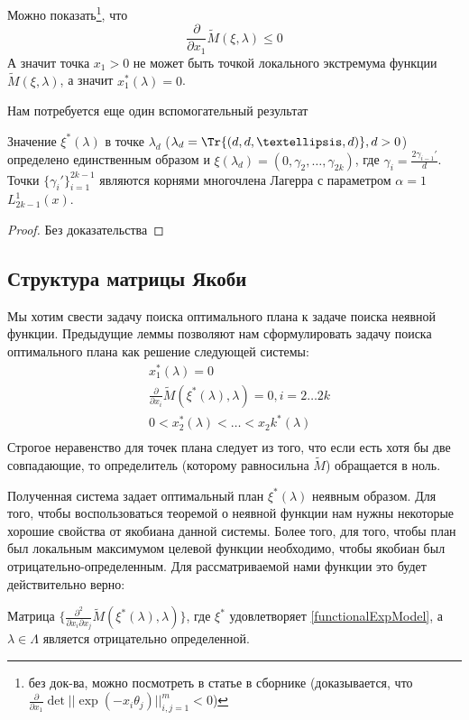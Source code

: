Можно показать\footnote{без док-ва, можно посмотреть в статье в сборнике (доказывается, что $\frac{\partial}{\partial x_1} \det ||\exp(-x_i\theta_j)||_{i,j=1}^m < 0$)}, что 
$$\frac{\partial}{\partial x_1} \tilde{M}(\xi, \lambda) \leq 0$$
А значит точка $x_1 > 0$ не может быть точкой локального экстремума функции $\tilde{M}(\xi, \lambda)$, а значит $x_1^{*}(\lambda) = 0$. 

Нам потребуется еще один вспомогательный результат
\begin{lem}
Значение $\xi^{*}(\lambda)$ в точке $\lambda_d$ ($\lambda_d = \Tr{(d, d,…,d)}, d > 0$)  определено единственным образом и 
$\xi(\lambda_d) = (0, \gamma_2, …, \gamma_{2k})$, где $\gamma_i = \frac{2\gamma_{i-1}'}{d}$. Точки $\{ \gamma_i' \}_{i=1}^{2k-1}$ являются корнями многочлена Лагерра с параметром $\alpha = 1$ $L_{2k-1}^1(x)$.  
\end{lem}
\begin{proof}
Без доказательства
\end{proof}

\subsection{Структура матрицы Якоби}
Мы хотим свести задачу поиска оптимального плана к задаче поиска неявной функции. Предыдущие леммы позволяют нам сформулировать задачу поиска оптимального плана как решение следующей системы:
\begin{equation}
\label{functionalExpModel}
\begin{split}
&x_1^{*}(\lambda)=0 \\
&\frac{\partial}{\partial x_i}\tilde{M}(\xi^{*}(\lambda), \lambda) = 0, i = 2…2k \\
& 0 < x_2^{*}(\lambda) < … < x_2k^{*}(\lambda)\\
\end{split}
\end{equation}
Строгое неравенство для точек плана следует из того, что если есть хотя бы две совпадающие, то определитель (которому равносильна $\tilde{M}$) обращается в ноль. 

Полученная система задает оптимальный план $\xi^{*}(\lambda)$ неявным образом. Для того, чтобы воспользоваться теоремой о неявной функции нам нужны некоторые хорошие свойства от якобиана данной системы. Более того, для того, чтобы план был локальным максимумом целевой функции необходимо, чтобы  
якобиан был отрицательно-определенным. Для рассматриваемой нами функции это будет действительно верно:
\begin{thm}
Матрица $\{ \frac{\partial^2}{\partial x_i \partial x_j} \tilde{M}(\xi^{*}(\lambda), \lambda)\}$, где $\xi^{*}$ удовлетворяет \eqref{functionalExpModel}, а  $\lambda \in \Lambda$ является отрицательно определенной.
\end{thm}

